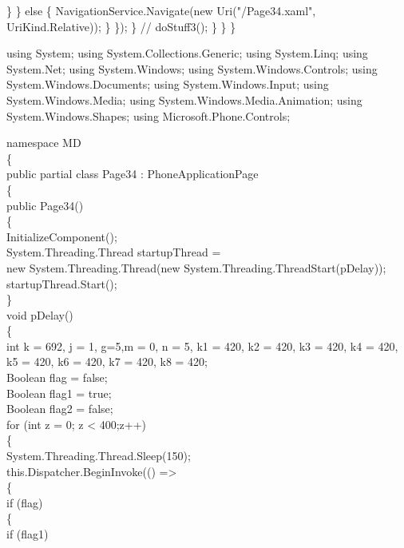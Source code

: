 {{                        \}
                    \}
                    else
                    \{
                        NavigationService.Navigate(new Uri("/Page34.xaml", UriKind.Relative));
                    \}
                \});
            \}
            //    doStuff3();
        \}
    \}
\}

using System;
using System.Collections.Generic;
using System.Linq;
using System.Net;
using System.Windows;
using System.Windows.Controls;
using System.Windows.Documents;
using System.Windows.Input;
using System.Windows.Media;
using System.Windows.Media.Animation;
using System.Windows.Shapes;
using Microsoft.Phone.Controls;

namespace MD\\
\{\\
    public partial class Page34 : PhoneApplicationPage\\
    \{\\
        public Page34()\\
        \{\\
            InitializeComponent();\\
            System.Threading.Thread startupThread =\\
                          new System.Threading.Thread(new System.Threading.ThreadStart(pDelay));\\
            startupThread.Start();\\
        \}\\
        void pDelay()\\
        \{\\
            int k = 692, j = 1, g=5,m = 0, n = 5, k1 = 420, k2 = 420, k3 = 420, k4 = 420, k5 = 420, k6 = 420, k7 = 420, k8 = 420;\\
            Boolean flag = false;\\
            Boolean flag1 = true;\\
            Boolean flag2 = false;\\
            for (int z = 0; z < 400;z++)\\
            \{\\
                System.Threading.Thread.Sleep(150);\\
                this.Dispatcher.BeginInvoke(() =>\\
                \{\\
                    if (flag)\\
                    \{\\
                        if (flag1)\\
}}
